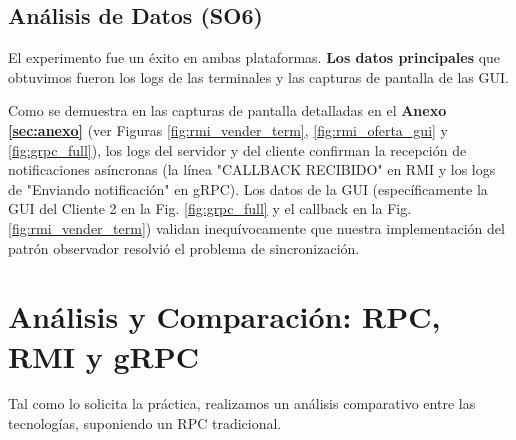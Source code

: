 \documentclass[11pt, a4paper]{article}
\begin{document}
\subsection{Análisis de Datos (SO6)}
El experimento fue un éxito en ambas plataformas.
\textbf{Los datos principales} que obtuvimos fueron los logs de las terminales y las capturas de pantalla de las GUI.

Como se demuestra en las capturas de pantalla detalladas en el \textbf{Anexo \ref{sec:anexo}} (ver Figuras \ref{fig:rmi_vender_term}, \ref{fig:rmi_oferta_gui} y \ref{fig:grpc_full}), los logs del servidor y del cliente confirman la recepción de notificaciones asíncronas (la línea "CALLBACK RECIBIDO" en RMI y los logs de "Enviando notificación" en gRPC).
Los datos de la GUI (específicamente la GUI del Cliente 2 en la Fig. \ref{fig:grpc_full} y el callback en la Fig. \ref{fig:rmi_vender_term}) validan inequívocamente que nuestra implementación del patrón observador resolvió el problema de sincronización.
\section{Análisis y Comparación: RPC, RMI y gRPC}
\label{sec:comparacion}

Tal como lo solicita la práctica, realizamos un análisis comparativo entre las tecnologías, suponiendo un RPC tradicional.
\end{document}
